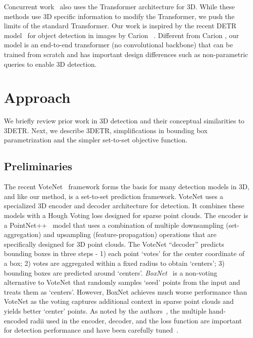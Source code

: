 \documentclass[10pt,twocolumn,letterpaper]{article}
\newcommand{\OURS}{3DETR\xspace}
\begin{document}
Concurrent work~\cite{zhao2020point,pan20203d} also uses the Transformer architecture for 3D.
While these methods use 3D specific information to modify the Transformer, we push the limits of the standard Transformer.
Our work is inspired by the recent DETR model~\cite{carion2020end} for object detection in images by Carion \etal~\cite{carion2020end}.
Different from Carion \etal, our model is an end-to-end transformer (no convolutional backbone) that can be trained from scratch and has important design differences such as non-parametric queries to enable 3D detection.










\vspace{-0.05in}
\section{Approach}
\label{sec:approach}
\vspace{-0.05in}


We briefly review prior work in 3D detection and their conceptual similarities to \OURS.
Next, we describe \OURS,
simplifications in bounding box parametrization and the simpler set-to-set objective function.

\vspace{-0.05in}
\subsection{Preliminaries}
\label{sec:preliminaries}
\vspace{-0.05in}

The recent VoteNet~\cite{qi2019votenet} framework forms the basis for many detection models in 3D, and like our method, is a set-to-set prediction framework. VoteNet uses a specialized 3D encoder and decoder architecture for detection. It combines these models with a Hough Voting loss designed for sparse point clouds.
The encoder is a PointNet++~\cite{qi2017pointnet++} model that uses a combination of multiple downsampling (set-aggregation) and upsampling (feature-propagation) operations that are specifically designed for 3D point clouds.
The VoteNet ``decoder'' predicts bounding boxes in three steps - 1) each point `votes' for the center coordinate of a box; 2) votes are aggregated within a fixed radius to obtain `centers'; 3) bounding boxes are predicted around `centers'.
\emph{BoxNet}~\cite{qi2019votenet} is a non-voting alternative to VoteNet that randomly samples `seed' points from the input and treats them as `centers'.
However, BoxNet achieves much worse performance than VoteNet as the voting captures additional context in sparse point clouds and yields better `center' points.
As noted by the authors~\cite{qi2019votenet}, the multiple hand-encoded radii used in the encoder, decoder, and the loss function are important for detection performance and have been carefully tuned~\cite{qi2017pointnet++,qi2017pointnet}.
\end{document}
